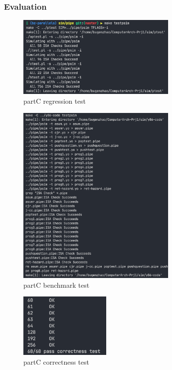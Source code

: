 \documentclass{article}
\begin{document}
\subsubsection{Evaluation}
\begin{figure}[H] %
        \centering %
        \includegraphics[width=0.7\textwidth]{partC-regression-test.png} %
        \caption{partC regression test} %
        \label{Fig.partC-regression} %
\end{figure}
\begin{figure}[H] %
        \centering %
        \includegraphics[width=0.7\textwidth]{partC-test2.png} %
        \caption{partC benchmark test} %
        \label{Fig.partC-benchmark} %
\end{figure}
\begin{figure}[H] %
        \centering %
        \includegraphics[width=0.4\textwidth]{partC-correctness-test.png} %
        \caption{partC correctness test} %
        \label{Fig.partC-correctness} %
\end{figure}
\end{document}
